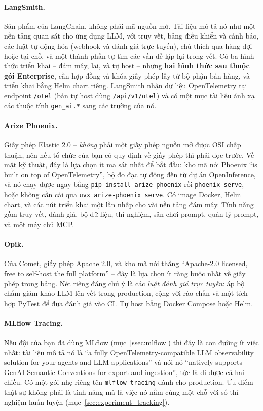 \paragraph{LangSmith.} Sản phẩm của LangChain, không phải mã nguồn mở. Tài liệu mô tả nó như một nền tảng quan sát cho ứng dụng LLM, với truy vết, bảng điều khiển và cảnh báo, các luật tự động hóa (webhook và đánh giá trực tuyến), chú thích qua hàng đợi hoặc tại chỗ, và một thành phần tự tìm các vấn đề lặp lại trong vết. Có ba hình thức triển khai -- đám mây, lai, và tự host -- nhưng \textbf{hai hình thức sau thuộc gói Enterprise}, cần hợp đồng và khóa giấy phép lấy từ bộ phận bán hàng, và triển khai bằng Helm chart riêng. LangSmith nhận dữ liệu OpenTelemetry tại endpoint \texttt{/otel} (bản tự host dùng \texttt{/api/v1/otel}) và có một mục tài liệu ánh xạ các thuộc tính \texttt{gen\_ai.*} sang các trường của nó.

\paragraph{Arize Phoenix.} Giấy phép Elastic 2.0 -- \emph{không} phải một giấy phép nguồn mở được OSI chấp thuận, nên nếu tổ chức của bạn có quy định về giấy phép thì phải đọc trước. Về mặt kỹ thuật, đây là lựa chọn ít ma sát nhất để bắt đầu: kho mã nói Phoenix ``is built on top of OpenTelemetry'', bộ đo đạc tự động đến từ dự án OpenInference, và nó chạy được ngay bằng \texttt{pip install arize-phoenix} rồi \texttt{phoenix serve}, hoặc không cần cài qua \texttt{uvx arize-phoenix serve}. Có image Docker, Helm chart, và các nút triển khai một lần nhấp cho vài nền tảng đám mây. Tính năng gồm truy vết, đánh giá, bộ dữ liệu, thí nghiệm, sân chơi prompt, quản lý prompt, và một máy chủ MCP.

\paragraph{Opik.} Của Comet, giấy phép Apache 2.0, và kho mã nói thẳng ``Apache-2.0 licensed, free to self-host the full platform'' -- đây là lựa chọn ít ràng buộc nhất về giấy phép trong bảng. Nét riêng đáng chú ý là các \emph{luật đánh giá trực tuyến}: áp bộ chấm giám khảo LLM lên vết trong production, cộng với rào chắn và một tích hợp PyTest để đưa đánh giá vào CI. Tự host bằng Docker Compose hoặc Helm.

\paragraph{MLflow Tracing.} Nếu đội của bạn đã dùng MLflow (mục~\ref{ssec:mlflow}) thì đây là con đường ít việc nhất: tài liệu mô tả nó là ``a fully OpenTelemetry-compatible LLM observability solution for your agents and LLM applications'' và nói nó ``natively supports GenAI Semantic Conventions for export and ingestion'', tức là đi được cả hai chiều. Có một gói nhẹ riêng tên \texttt{mlflow-tracing} dành cho production. Ưu điểm thật sự không phải là tính năng mà là việc nó nằm cùng một chỗ với sổ thí nghiệm huấn luyện (mục~\ref{sec:experiment_tracking}).

